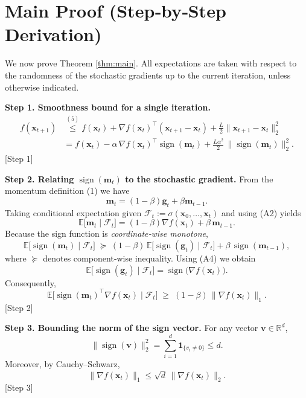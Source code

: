 \documentclass{article}
\newcommand{\sign}{\operatorname{sign}}
\newcommand{\E}{\mathbb{E}}
\newcommand{\R}{\mathbb{R}}
\begin{document}
\section*{Main Proof (Step‑by‑Step Derivation)}
We now prove Theorem \ref{thm:main}.  All expectations are taken with respect to the randomness of the stochastic gradients up to the current iteration, unless otherwise indicated.

\noindent\textbf{Step 1. Smoothness bound for a single iteration.}
\begin{align}
f(\bm{x}_{t+1})
&\overset{(5)}{\le}
f(\bm{x}_{t}) + \nabla f(\bm{x}_{t})^{\!\top}(\bm{x}_{t+1}-\bm{x}_{t})
     +\frac{L}{2}\|\bm{x}_{t+1}-\bm{x}_{t}\|_{2}^{2}                                           \nonumber\\[1mm]
&= f(\bm{x}_{t}) -\alpha\,\nabla f(\bm{x}_{t})^{\!\top}\sign(\bm{m}_{t})
   +\frac{L\alpha^{2}}{2}\,\|\sign(\bm{m}_{t})\|_{2}^{2}.                                            \tag{7}
\end{align}
[Step 1]

\noindent\textbf{Step 2. Relating $\sign(\bm{m}_{t})$ to the stochastic gradient.}
From the momentum definition (1) we have
\[
\bm{m}_{t}= (1-\beta)\bm{g}_{t}+ \beta\bm{m}_{t-1}.
\tag{8}
\]
Taking conditional expectation given $\mathcal{F}_{t}:=\sigma(\bm{x}_{0},\dots,\bm{x}_{t})$ and using (A2) yields
\[
\E\big[\bm{m}_{t}\mid\mathcal{F}_{t}\big]=(1-\beta)\nabla f(\bm{x}_{t})+\beta\,\bm{m}_{t-1}.
\tag{9}
\]
Because the sign function is \emph{coordinate‑wise monotone},
\[
\E\!\big[\sign(\bm{m}_{t})\mid\mathcal{F}_{t}\big]
\;\succeq\; (1-\beta)\,\E\!\big[\sign(\bm{g}_{t})\mid\mathcal{F}_{t}\big]
      +\beta\,\sign(\bm{m}_{t-1}),
\tag{10}
\]
where $\succeq$ denotes component‑wise inequality.  Using (A4) we obtain
\[
\E\!\big[\sign(\bm{g}_{t})\mid\mathcal{F}_{t}\big]
= \sign\!\big(\nabla f(\bm{x}_{t})\big).
\tag{11}
\]
Consequently,
\[
\E\!\big[\sign(\bm{m}_{t})^{\!\top}\nabla f(\bm{x}_{t})\mid\mathcal{F}_{t}\big]
\;\ge\; (1-\beta)\,\|\nabla f(\bm{x}_{t})\|_{1}.                                           \tag{12}
\]
[Step 2]

\noindent\textbf{Step 3. Bounding the norm of the sign vector.}
For any vector $\bm{v}\in\R^{d}$,
\[
\|\sign(\bm{v})\|_{2}^{2}= \sum_{i=1}^{d}\mathbf{1}_{\{v_{i}\neq0\}}\le d.
\tag{13}
\]
Moreover, by Cauchy–Schwarz,
\[
\|\nabla f(\bm{x}_{t})\|_{1}\le \sqrt{d}\,\|\nabla f(\bm{x}_{t})\|_{2}.
\tag{14}
\]
[Step 3]
\end{document}
